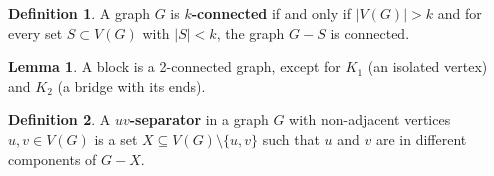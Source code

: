 \documentclass{article}
\theoremstyle{definition}
\newtheorem{lemma}{Lemma}
\newtheorem{definition}{Definition}
\begin{document}
\begin{definition}
A graph $G$ is \textbf{$k$-connected} if and only if $|V(G)| > k$ and for every set $S \subset V(G)$ with $|S| < k$, the graph $G - S$ is connected.
\end{definition}

\begin{lemma}
A block is a 2-connected graph, except for $K_1$ (an isolated vertex) and $K_2$ (a bridge with its ends).
\end{lemma}

\begin{definition}
A \textbf{$uv$-separator} in a graph $G$ with non-adjacent vertices $u, v \in V(G)$ is a set $X \subseteq V(G) \setminus \{u,v\}$ such that $u$ and $v$ are in different components of $G - X$.
\end{definition}
\end{document}
